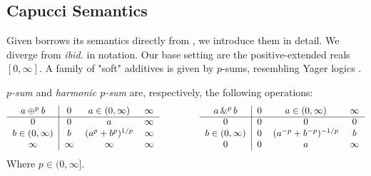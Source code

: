     

    



\subsection{Capucci Semantics}
\label{CapucciSemantics}
Given \OL{} borrows its semantics directly from \citeauthor{capucci2024quantifiers}, we introduce them in detail. We diverge from \emph{ibid.} in notation. Our base setting are the positive-extended reals $[0,\infty]$. 
A family of "soft" additives is given by $p$-sums, resembling Yager logics \citep{cintula2011handbook}.

\begin{definition}[$p$-Sum]
\label{$p$-Sum}
    \emph{$p$-sum} and \emph{harmonic $p$-sum} are, respectively, the following operations:
    \begin{equation*}
		\begin{tabular}{c|ccc}
			$a \psum{p} b$ & $0$ & $a \in (0,\infty)$ & $\infty$\\
			\cline{1-4}
			$0$ 			   & $0$ & $a$ 		& $\infty$\\
			$b \in (0,\infty)$ & $b$ & $(a^{p}+b^{p})^{1/p}$		& $\infty$\\
			$\infty$ 		   & $\infty$ & $\infty$ & $\infty$
		\end{tabular}
		\hspace*{10ex}
		\begin{tabular}{c|ccc}
			\textnormal{$a \phsum{p} b$} & $0$ & $a \in (0,\infty)$ & $\infty$\\
			\cline{1-4}
			$0$ 		 	   & $0$ 		& $0$ 	   & $0$\\
			$b \in (0,\infty)$ & $0$ 		& $(a^{-p}+b^{-p})^{-1/p}$	   & $b$\\
			$0$ 		   & $0$ 	& $a$ & $\infty$
		\end{tabular}
	\end{equation*}
    Where $p \in (0,\infty].$
\end{definition}

